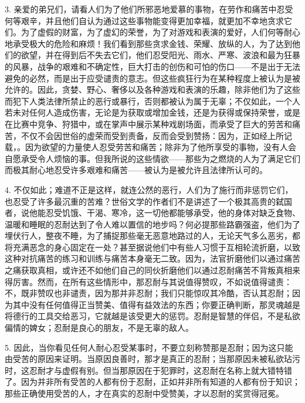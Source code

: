 3. 亲爱的弟兄们，请看人们为了他们所邪恶地爱慕的事物，在劳作和痛苦中忍受何等艰辛，并且他们自认为通过这些事物能变得更加幸福，就更加不幸地贪求它们。为了虚假的财富，为了虚幻的荣誉，为了对游戏和表演的爱好，人们何等耐心地承受极大的危险和麻烦！我们看到那些贪求金钱、荣耀、放纵的人，为了达到他们的欲望，并在得到后不失去它们，他们忍受阳光、雨水、严寒、波浪和最为狂暴的风暴，战争的艰难和不确定性，巨大打击的创伤和可怕的伤口——不是出于无法避免的必然，而是出于应受谴责的意志。但这些疯狂行为在某种程度上被认为是被允许的。因此，贪婪、野心、奢侈以及各种游戏和表演的乐趣，除非他们为了这些而犯下人类法律所禁止的恶行或暴行，否则都被认为属于无辜；不仅如此，一个人若未对任何人造成伤害，无论是为获取或增加金钱，还是为获得或保持荣誉，或是在比赛中竞争、狩猎中，或在掌声中展示某种戏剧场面，而承受了巨大的劳苦和痛苦，不仅不会因世俗的虚荣而受到责备，反而会受到赞扬：因为，正如经上所记载，。因为欲望的力量使人忍受劳苦和痛苦；除非为了他所享受的事物，没有人会自愿承受令人烦恼的事。但我所说的这些情欲——那些为之燃烧的人为了满足它们而极其耐心地忍受许多艰难和痛苦——被认为是被允许且法律所认可的。\par

4. 不仅如此；难道不正是这样，就连公然的恶行，人们为了施行而非惩罚它们，也忍受了许多最沉重的苦难？世俗文学的作者们不是讲述了一个极其高贵的弑国者，说他能忍受饥饿、干渴、寒冷，这一切他都能够承受，他的身体对缺乏食物、温暖和睡眠的忍耐达到了令人难以置信的地步吗？何必提那些路霸强盗，他们为了埋伏行人，整夜不睡，为了捕捉那些毫无恶意地路过的人，无论天气多么恶劣，都将充满恶念的身心固定在一处？甚至据说他们中有些人习惯于互相轮流折磨，以致这种对抗痛苦的练习和训练与痛苦本身毫无二致。因为，法官折磨他们以通过痛苦之痛获取真相，或许还不如他们自己的同伙折磨他们以通过忍耐痛苦不背叛真相来得厉害。然而，在所有这些情形中，那忍耐与其说值得赞叹，不如说值得谴责：不，既非赞叹也非谴责，因为那并非忍耐；我们只能惊叹其冷酷，否认其忍耐；因为其中没有任何值得正当赞美、值得有益效法的东西；你要正确判断，那灵魂越是将德行的工具交给恶习，它就越是该受更大的惩罚。忍耐是智慧的伴侣，不是私欲偏情的婢女；忍耐是良心的朋友，不是无辜的敌人。\par

5. 因此，当你看见任何人耐心忍受某事时，不要立刻称赞那是忍耐；因为这只能由受苦的原因来证明。当原因良善时，那才是真正的忍耐；当那原因未被私欲玷污时，这忍耐才与虚假有别。但当那原因在于犯罪时，这忍耐在名称上就大错特错了。因为并非所有受苦的人都有份于忍耐，正如并非所有知道的人都有份于知识；那些正确使用受苦的人，才在真实的忍耐中受赞美，才以忍耐的奖赏得冠冕。\par

